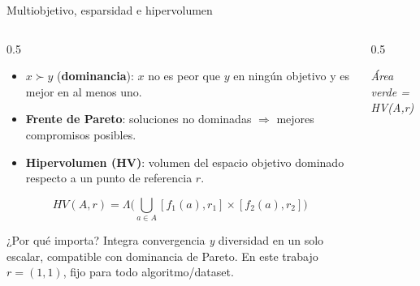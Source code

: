 \documentclass[aspectratio=169,10pt]{beamer}
\begin{document}
\begin{frame}{Multiobjetivo, esparsidad e hipervolumen}
  \begin{columns}[T]
    \begin{column}{0.5\textwidth}
      \small
      \begin{itemize}
        \item $x \succ y$ (\textbf{dominancia}): $x$ no es peor que $y$ en ningún objetivo y es mejor en al menos uno.
        \item \textbf{Frente de Pareto}: soluciones no dominadas $\Rightarrow$ mejores compromisos posibles.
        \item \textbf{Hipervolumen (HV)}: volumen del espacio objetivo dominado respecto a un punto de referencia $r$.
      \end{itemize}
      \[
        HV(A,r)=\Lambda\!\Big(\bigcup_{a\in A}[f_1(a),r_1]\times[f_2(a),r_2]\Big)
      \]
      \begin{alertblock}{¿Por qué importa?}
        \footnotesize Integra convergencia \emph{y} diversidad en un solo escalar, compatible con dominancia de Pareto. En este trabajo $r=(1,1)$, fijo para todo algoritmo/dataset.
      \end{alertblock}
    \end{column}
    \begin{column}{0.5\textwidth}
      \centering
      \small\textit{Área verde = HV(A,r)}
    \end{column}
  \end{columns}
\end{frame}

\end{document}
